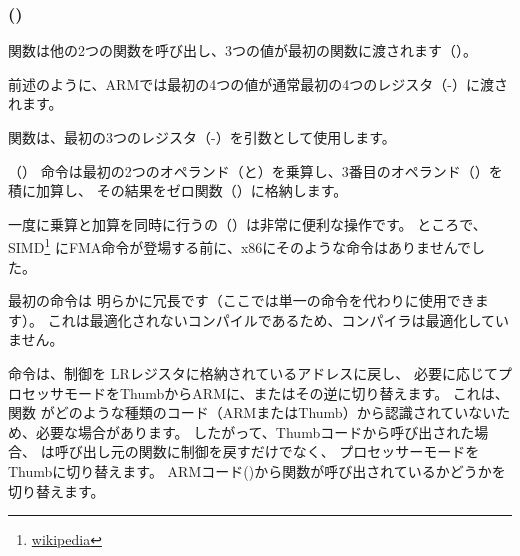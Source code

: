 \subsubsection{\NonOptimizingKeilVI (\ARMMode)}



\main 関数は他の2つの関数を呼び出し、3つの値が最初の関数に渡されます（\ttf）。

前述のように、ARMでは最初の4つの値が通常最初の4つのレジスタ（-）に渡されます。

\ttf 関数は、最初の3つのレジスタ（-）を引数として使用します。

（）
命令は最初の2つのオペランド（と）を乗算し、3番目のオペランド（）を積に加算し、
その結果をゼロ関数（）に格納します。

一度に乗算と加算を同時に行うの（）は非常に便利な操作です。
ところで、SIMD\footnote{\href{http://go.yurichev.com/17103}{wikipedia}}
にFMA命令が登場する前に、x86にそのような命令はありませんでした。

最初の命令は
明らかに冗長です（ここでは単一の命令を代わりに使用できます）。
これは最適化されないコンパイルであるため、コンパイラは最適化していません。


命令は、制御を \ac{LR}レジスタに格納されているアドレスに戻し、
必要に応じてプロセッサモードをThumbからARMに、またはその逆に切り替えます。
これは、関数 \ttf がどのような種類のコード（ARMまたはThumb）から認識されていないため、必要な場合があります。
したがって、Thumbコードから呼び出された場合、
は呼び出し元の関数に制御を戻すだけでなく、
プロセッサーモードをThumbに切り替えます。 
ARMコード()から関数が呼び出されているかどうかを切り替えます。

